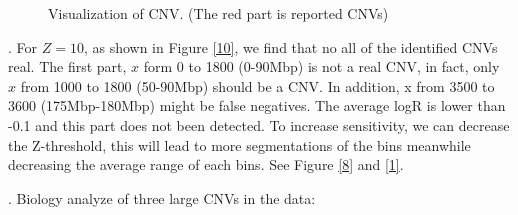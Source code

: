 \documentclass[a4paper]{article}
\begin{document}
\begin{figure}[h]
	\centering
	\caption{Visualization of CNV. (The red part is reported CNVs)}
	\label{fig} 
\end{figure}

. For $Z=10$, as shown in Figure \ref{10}, we find that no all of the identified CNVs real. The first part, $x$ form 0 to 1800 (0-90Mbp) is not a real CNV, in fact, only $x$ from 1000 to 1800 (50-90Mbp) should be a CNV. In addition, x from 3500 to 3600 (175Mbp-180Mbp) might be false negatives. The average logR is lower than -0.1 and this part does not been detected. To increase sensitivity, we can decrease the Z-threshold, this will lead to more segmentations of the bins meanwhile decreasing the average range of each bins. See Figure \ref{8} and \ref{1}.

. Biology analyze of three large CNVs in the data:
\end{document}
